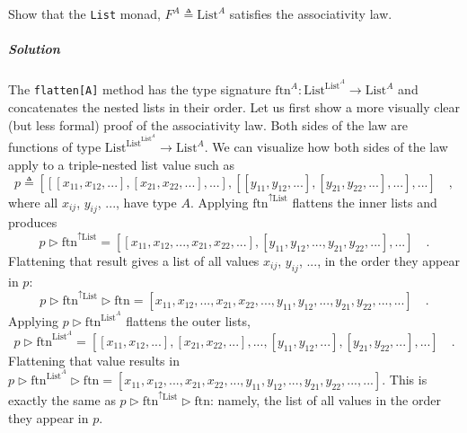 Show that the \lstinline!List! monad, $F^{A}\triangleq\text{List}^{A}$
satisfies the associativity law.

\subparagraph{Solution}

The \lstinline!flatten[A]! method has the type signature $\text{ftn}^{A}:\text{List}^{\text{List}^{A}}\rightarrow\text{List}^{A}$
and concatenates the nested lists in their order. Let us first show
a more visually clear (but less formal) proof of the associativity
law. Both sides of the law are functions of type $\text{List}^{\text{List}^{\text{List}^{A}}}\rightarrow\text{List}^{A}$.
We can visualize how both sides of the law apply to a triple-nested
list value such as
\[
p\triangleq\left[\left[\left[x_{11},x_{12},...\right],\left[x_{21},x_{22},...\right],...\right],\left[\left[y_{11},y_{12},...\right],\left[y_{21},y_{22},...\right],...\right],...\right]\quad,
\]
where all $x_{ij}$, $y_{ij}$, ..., have type $A$. Applying $\text{ftn}^{\uparrow\text{List}}$
flattens the inner lists and produces
\[
p\triangleright\text{ftn}^{\uparrow\text{List}}=\left[\left[x_{11},x_{12},...,x_{21},x_{22},...\right],\left[y_{11},y_{12},...,y_{21},y_{22},...\right],...\right]\quad.
\]
Flattening that result gives a list of all values $x_{ij}$, $y_{ij}$,
..., in the order they appear in $p$:
\[
p\triangleright\text{ftn}^{\uparrow\text{List}}\triangleright\text{ftn}=\left[x_{11},x_{12},...,x_{21},x_{22},...,y_{11},y_{12},...,y_{21},y_{22},...,...\right]\quad.
\]
Applying $p\triangleright\text{ftn}^{\text{List}^{A}}$ flattens the
outer lists,
\[
p\triangleright\text{ftn}^{\text{List}^{A}}=\left[\left[x_{11},x_{12},...\right],\left[x_{21},x_{22},...\right],...,\left[y_{11},y_{12},...\right],\left[y_{21},y_{22},...\right],...\right]\quad.
\]
Flattening that value results in $p\triangleright\text{ftn}^{\text{List}^{A}}\triangleright\text{ftn}=\left[x_{11},x_{12},...,x_{21},x_{22},...,y_{11},y_{12},...,y_{21},y_{22},...,...\right]$.
This is exactly the same as $p\triangleright\text{ftn}^{\uparrow\text{List}}\triangleright\text{ftn}$:
namely, the list of all values in the order they appear in $p$.

